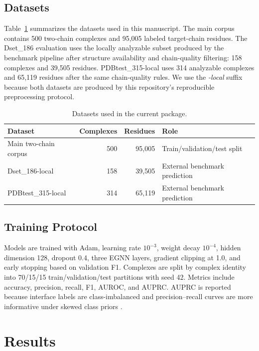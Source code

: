 \documentclass[runningheads]{llncs}
\begin{document}
\subsection{Datasets}

Table~\ref{tab:datasets} summarizes the datasets used in this manuscript. The main
corpus contains 500 two-chain complexes and 95,005 labeled target-chain residues. The
Dset\_186 evaluation uses the locally analyzable subset produced by the benchmark
pipeline after structure availability and chain-quality filtering: 158 complexes and
39,505 residues. PDBtest\_315-local uses 314 analyzable complexes and 65,119 residues
after the same chain-quality rules. We use the \emph{-local} suffix because both datasets
are produced by this repository's reproducible preprocessing protocol.

\begin{table}[t]
\centering
\caption{Datasets used in the current package.}
\label{tab:datasets}
\begin{tabular}{lrrl}
\toprule
Dataset & Complexes & Residues & Role \\
\midrule
Main two-chain corpus & 500 & 95,005 & Train/validation/test split \\
Dset\_186-local & 158 & 39,505 & External benchmark prediction \\
PDBtest\_315-local & 314 & 65,119 & External benchmark prediction \\
\bottomrule
\end{tabular}
\end{table}

\subsection{Training Protocol}

Models are trained with Adam, learning rate \(10^{-3}\), weight decay \(10^{-4}\),
hidden dimension 128, dropout 0.4, three EGNN layers, gradient clipping at 1.0, and
early stopping based on validation F1. Complexes are split by complex identity into
70/15/15 train/validation/test partitions with seed 42. Metrics include accuracy,
precision, recall, F1, AUROC, and AUPRC. AUPRC is reported because interface labels are
class-imbalanced and precision--recall curves are more informative under skewed class
priors \cite{davis2006pr}.

\section{Results}
\end{document}

